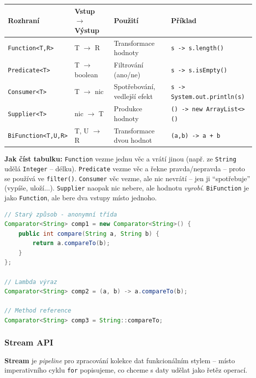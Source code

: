 \begin{center}
\begin{tabular}{llll}
\toprule
\textbf{Rozhraní} & \textbf{Vstup $\to$ Výstup} & \textbf{Použití} & \textbf{Příklad} \\
\midrule
\texttt{Function<T,R>} & T $\to$ R & Transformace hodnoty & \texttt{s -> s.length()} \\
\texttt{Predicate<T>} & T $\to$ boolean & Filtrování (ano/ne) & \texttt{s -> s.isEmpty()} \\
\texttt{Consumer<T>} & T $\to$ nic & Spotřebování, vedlejší efekt & \texttt{s -> System.out.println(s)} \\
\texttt{Supplier<T>} & nic $\to$ T & Produkce hodnoty & \texttt{() -> new ArrayList<>()} \\
\texttt{BiFunction<T,U,R>} & T, U $\to$ R & Transformace dvou hodnot & \texttt{(a,b) -> a + b} \\
\bottomrule
\end{tabular}
\end{center}

\textbf{Jak číst tabulku:} \texttt{Function} vezme jednu věc a vrátí jinou (např. ze \texttt{String} udělá \texttt{Integer} -- délku).
\texttt{Predicate} vezme věc a řekne pravda/nepravda -- proto se používá ve \texttt{filter()}.
\texttt{Consumer} věc vezme, ale nic nevrátí -- jen ji ``spotřebuje'' (vypíše, uloží...).
\texttt{Supplier} naopak nic nebere, ale hodnotu \textit{vyrobí}.
\texttt{BiFunction} je jako \texttt{Function}, ale bere dva vstupy místo jednoho.

\begin{lstlisting}[language=Java, caption=Lambda výrazy]
// Starý způsob - anonymní třída
Comparator<String> comp1 = new Comparator<String>() {
    public int compare(String a, String b) {
        return a.compareTo(b);
    }
};

// Lambda výraz
Comparator<String> comp2 = (a, b) -> a.compareTo(b);

// Method reference
Comparator<String> comp3 = String::compareTo;
\end{lstlisting}

\subsubsection{Stream API}

\textbf{Stream} je \textit{pipeline} pro zpracování kolekce dat funkcionálním stylem -- místo imperativního cyklu \texttt{for} popisujeme, co chceme s daty udělat jako řetěz operací.

